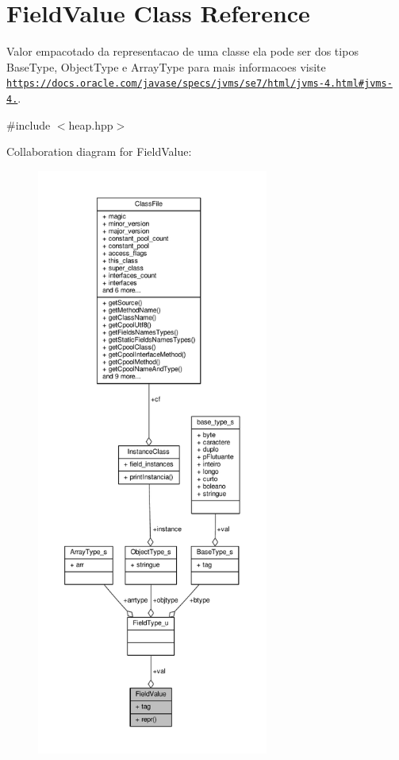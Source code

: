 \hypertarget{classFieldValue}{\section{Field\+Value Class Reference}
\label{classFieldValue}
}


Valor empacotado da representacao de uma classe ela pode ser dos tipos Base\+Type, Object\+Type e Array\+Type para mais informacoes visite \href{https://docs.oracle.com/javase/specs/jvms/se7/html/jvms-4.html#jvms-4.5}{\tt https\+://docs.\+oracle.\+com/javase/specs/jvms/se7/html/jvms-\/4.\+html\#jvms-\/4.}.  




{\ttfamily \#include $<$heap.\+hpp$>$}



Collaboration diagram for Field\+Value\+:
\nopagebreak
\begin{figure}[H]
\begin{center}
\leavevmode
\includegraphics[height=550pt]{classFieldValue__coll__graph}
\end{center}
\end{figure}
